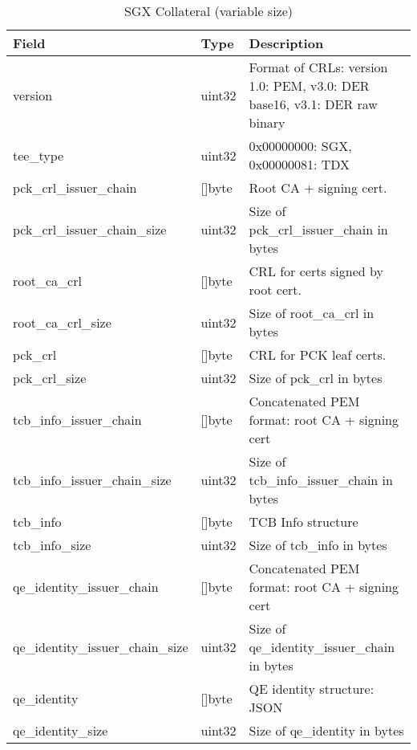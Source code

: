 \begin{table}[h]
	\begin{tabularx}{\textwidth}{|l|l|X|}
		\hline
		\textbf{Field}                     & \textbf{Type}    & \textbf{Description} \\ \hline
		version                            & uint32           & Format of CRLs: version 1.0: PEM, v3.0: DER base16, v3.1: DER raw binary \\ \hline
		tee\_type                          & uint32           & 0x00000000: SGX, 0x00000081: TDX \\ \hline
		pck\_crl\_issuer\_chain            & []byte           & Root CA + signing cert. \\ \hline
		pck\_crl\_issuer\_chain\_size      & uint32           & Size of pck\_crl\_issuer\_chain in bytes \\ \hline
		root\_ca\_crl                      & []byte           & CRL for certs signed by root cert. \\ \hline
		root\_ca\_crl\_size                & uint32           & Size of root\_ca\_crl in bytes \\ \hline
		pck\_crl                           & []byte           & CRL for PCK leaf certs. \\ \hline
		pck\_crl\_size                     & uint32           & Size of pck\_crl in bytes \\ \hline
		tcb\_info\_issuer\_chain           & []byte           & Concatenated PEM format: root CA + signing cert \\ \hline
		tcb\_info\_issuer\_chain\_size     & uint32           & Size of tcb\_info\_issuer\_chain in bytes \\ \hline
		tcb\_info                          & []byte           & TCB Info structure \\ \hline
		tcb\_info\_size                    & uint32           & Size of tcb\_info in bytes \\ \hline
		qe\_identity\_issuer\_chain        & []byte           & Concatenated PEM format: root CA + signing cert \\ \hline
		qe\_identity\_issuer\_chain\_size  & uint32           & Size of qe\_identity\_issuer\_chain in bytes \\ \hline
		qe\_identity                       & []byte           & QE identity structure: JSON \\ \hline
		qe\_identity\_size                 & uint32           & Size of qe\_identity in bytes \\ \hline
	\end{tabularx}
	\centering
	\caption{SGX Collateral (variable size) \cite{dcap_library_code}}
	\label{quote-collateral-table}
\end{table}

